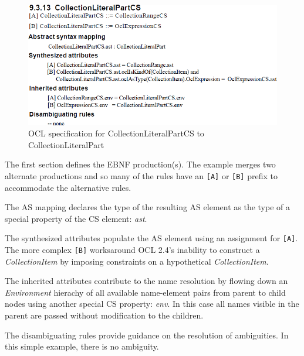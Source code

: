 \documentclass{llncs}
\begin{document}
\begin{figure}[htbp]
	\centering
	\includegraphics[scale=0.45]{images/CollectionLiteralPartOMG.png}
	\caption{OCL specification for CollectionLiteralPartCS to CollectionLiteralPart}
	\label{fig:CollectionLiteralPartOMG}
\end{figure}



The first section defines the EBNF production(s). The example merges two alternate productions and so many of the rules have an \verb$[A]$ or \verb$[B]$ prefix to accommodate the alternative rules.

The AS mapping declares the type of the resulting AS element as the type of a special property of the CS element: \emph{ast}.

The synthesized attributes populate the AS element using an assignment for \verb$[A]$. The more complex \verb$[B]$ worksaround OCL 2.4's inability to construct a  \emph{CollectionItem} by imposing constraints on a hypothetical \emph{CollectionItem}.

The inherited attributes contribute to the name resolution by flowing down an \textit{Environment} hierachy of all available name-element pairs from parent to child nodes using another special CS property: \emph{env}. In this case all names visible in the parent are passed without modification to the children.

The disambiguating rules provide guidance on the resolution of ambiguities. In this simple example, there is no ambiguity.
\end{document}

